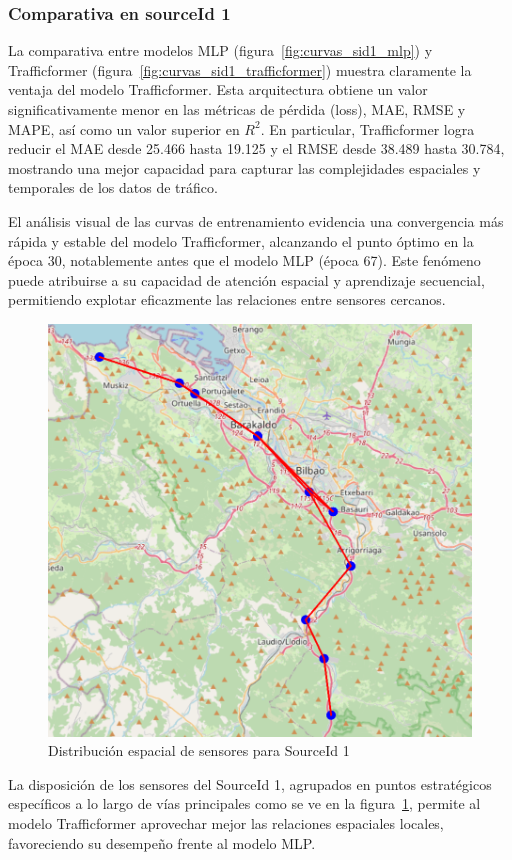 \subsubsection{Comparativa en sourceId 1}

La comparativa entre modelos MLP (figura~\ref{fig:curvas_sid1_mlp}) y Trafficformer (figura~\ref{fig:curvas_sid1_trafficformer}) muestra claramente la ventaja del modelo Trafficformer. Esta arquitectura obtiene un valor significativamente menor en las métricas de pérdida (loss), MAE, RMSE y MAPE, así como un valor superior en $R^2$. En particular, Trafficformer logra reducir el MAE desde 25.466 hasta 19.125 y el RMSE desde 38.489 hasta 30.784, mostrando una mejor capacidad para capturar las complejidades espaciales y temporales de los datos de tráfico.

El análisis visual de las curvas de entrenamiento evidencia una convergencia más rápida y estable del modelo Trafficformer, alcanzando el punto óptimo en la época 30, notablemente antes que el modelo MLP (época 67). Este fenómeno puede atribuirse a su capacidad de atención espacial y aprendizaje secuencial, permitiendo explotar eficazmente las relaciones entre sensores cercanos.

\begin{figure}[H]
	\centering
	\includegraphics[width=0.7\linewidth]{includes/cap5/source_id_1_meters_mask.png}
	\caption{Distribución espacial de sensores para SourceId 1}
	\label{fig:sensores_sid1}
\end{figure}

La disposición de los sensores del SourceId 1, agrupados en puntos estratégicos específicos a lo largo de vías principales como se ve en la figura~\ref{fig:sensores_sid1}, permite al modelo Trafficformer aprovechar mejor las relaciones espaciales locales, favoreciendo su desempeño frente al modelo MLP.

